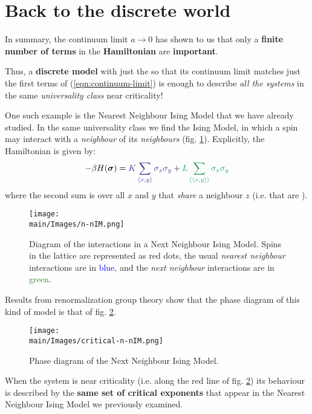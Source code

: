 \documentclass[../../main.tex]{subfiles}
\begin{document}
\section{Back to the discrete world}
In summary, the continuum limit $a \to 0$ has shown to us that only a \textbf{finite number of terms} in the \textbf{Hamiltonian} are \textbf{important}. 

Thus, a \textbf{discrete model} with just the  so that its continuum limit matches just the first terms of (\ref{eqn:continuum-limit}) is enough to describe \textit{all the systems} in the same \textit{universality class} near criticality!

\medskip

One such example is the Nearest Neighbour Ising Model that we have already studied. In the same universality class we find the  Ising Model, in which a spin may interact with a \textit{neighbour} of its \textit{neighbours} (fig. \ref{fig:n-nIM}). Explicitly, the Hamiltonian is given by:
\begin{align*}
    -\beta H(\bm{\sigma}) = \textcolor{Blue}{K \sum_{\langle x,y \rangle} \sigma_x \sigma_y} + \textcolor{ForestGreen}{L \sum_{\langle \langle x,y \rangle \rangle} \sigma_x \sigma_y}
\end{align*}
where the second sum is over all $x$ and $y$ that \textit{share} a neighbour $z$ (i.e. that are ).

\begin{figure}[H]
    \centering
    \texttt{[image: \\main/Images/n-nIM.png]}
    \caption{Diagram of the interactions in a Next Neighbour Ising Model. Spins in the lattice are represented as red dots, the usual \textit{nearest neighbour} interactions are in \textcolor{Blue}{blue}, and the \textit{next neighbour} interactions are in \textcolor{ForestGreen}{green}.}
    \label{fig:n-nIM}
\end{figure}

Results from renormalization group theory show that the phase diagram of this kind of model is that of fig. \ref{fig:critical-n-nIM}.

\begin{figure}[H]
    \centering
    \texttt{[image: \\main/Images/critical-n-nIM.png]}
    \caption{Phase diagram of the Next Neighbour Ising Model.}
    \label{fig:critical-n-nIM}
\end{figure}

When the system is near criticality (i.e. along the red line of fig. \ref{fig:critical-n-nIM}) its behaviour is described by the \textbf{same set of critical exponents} that appear in the Nearest Neighbour Ising Model we previously examined. 
\end{document}
